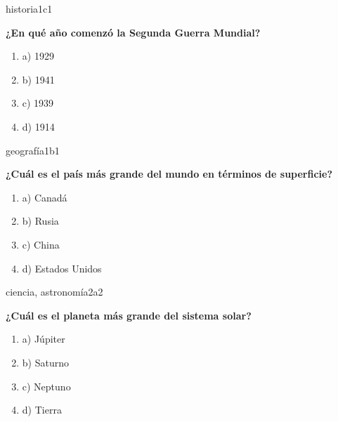 \documentclass{article}
\begin{document}
\begin{question}{1}{historia}{1}{c}{1}{
\textbf{¿En qué año comenzó la Segunda Guerra Mundial?}\\

\begin{enumerate}
    \item a) 1929
    \item b) 1941
    \item c) 1939
    \item d) 1914
\end{enumerate}
}
\end{question}

\begin{question}{2}{geografía}{1}{b}{1}{
\textbf{¿Cuál es el país más grande del mundo en términos de superficie?}\\

\begin{enumerate}
    \item a) Canadá
    \item b) Rusia
    \item c) China
    \item d) Estados Unidos
\end{enumerate}
}
\end{question}

\begin{question}{3}{ciencia, astronomía}{2}{a}{2}{
\textbf{¿Cuál es el planeta más grande del sistema solar?}\\

\begin{enumerate}
    \item a) Júpiter
    \item b) Saturno
    \item c) Neptuno
    \item d) Tierra
\end{enumerate}
}
\end{question}
\end{document}
